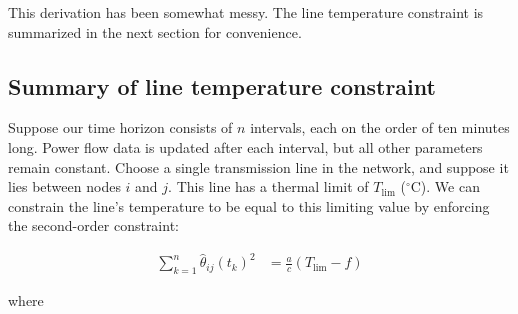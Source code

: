 \documentclass[conference]{IEEEtran}
\begin{document}
This derivation has been somewhat messy. The line temperature constraint is summarized in the next section for convenience.

\subsection{Summary of line temperature constraint}\label{summary-of-line-temperature-constraint}

Suppose our time horizon consists of $n$ intervals, each on the order of
ten minutes long. Power flow data is updated after each interval, but
all other parameters remain constant. Choose a single transmission
line in the network, and suppose it lies between nodes $i$ and $j$. This line has a
thermal limit of $T_\text{lim}$ ($^\circ$C). We can constrain the
line's temperature to be equal to this limiting value by enforcing the
second-order constraint:

\begin{align}\label{eq:tempconstraint}
\sum_{k=1}^n \hat{\theta}_{ij}(t_k)^2 &= \frac{a}{c}\left(T_\text{lim} - f\right)
\end{align}

where
\end{document}
